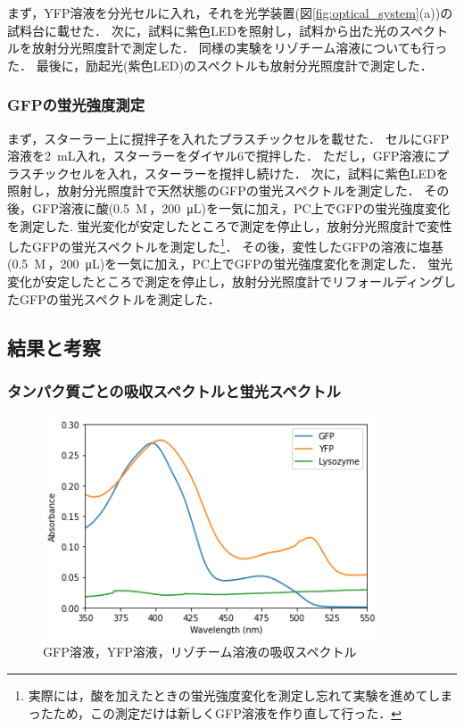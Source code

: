\documentclass[a4paper,11pt, titlepage]{jsarticle}
\begin{document}
まず，YFP溶液を分光セルに入れ，それを光学装置(図\ref{fig:optical_system}(a))の試料台に載せた．
次に，試料に紫色LEDを照射し，試料から出た光のスペクトルを放射分光照度計で測定した．
同様の実験をリゾチーム溶液についても行った．
最後に，励起光(紫色LED)のスペクトルも放射分光照度計で測定した．

\subsubsection{GFPの蛍光強度測定}
まず，スターラー上に撹拌子を入れたプラスチックセルを載せた．
セルにGFP溶液を\SI{2}{\milli\liter}入れ，スターラーをダイヤル6で撹拌した．
ただし，GFP溶液にプラスチックセルを入れ，スターラーを撹拌し続けた．
次に，試料に紫色LEDを照射し，放射分光照度計で天然状態のGFPの蛍光スペクトルを測定した．
その後，GFP溶液に酸(\SI{0.5}{M}\,，\SI{200}{\micro\liter})を一気に加え，PC上でGFPの蛍光強度変化を測定した. 
蛍光変化が安定したところで測定を停止し，放射分光照度計で変性したGFPの蛍光スペクトルを測定した\footnote{実際には，酸を加えたときの蛍光強度変化を測定し忘れて実験を進めてしまったため，この測定だけは新しくGFP溶液を作り直して行った．}．
その後，変性したGFPの溶液に塩基(\SI{0.5}{M}\,，\SI{200}{\micro\liter})を一気に加え，PC上でGFPの蛍光強度変化を測定した．
蛍光変化が安定したところで測定を停止し，放射分光照度計でリフォールディングしたGFPの蛍光スペクトルを測定した．

\subsection{結果と考察}

\subsubsection{タンパク質ごとの吸収スペクトルと蛍光スペクトル}

\begin{figure}[htbp]
    \centering
    \includegraphics[width=10cm]{absorbance.png}
    \caption{GFP溶液，YFP溶液，リゾチーム溶液の吸収スペクトル}
    \label{fig:absorbance}
\end{figure}
\end{document}
